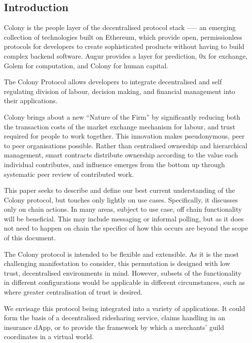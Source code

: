 \subsection*{Introduction}

Colony is the people layer of the decentralised protocol stack --— an emerging collection of technologies built on Ethereum, which provide open, permissionless protocols for developers to create sophisticated products without having to build complex backend software. Augur provides a layer for prediction, 0x for exchange, Golem for computation, and Colony for human capital.

The Colony Protocol allows developers to integrate decentralised and self regulating division of labour, decision making, and financial management into their applications. 

Colony brings about a new ``Nature of the Firm'' \cite{The-Nature-of-the-Firm} by significantly reducing both the transaction costs of the market exchange mechanism for labour, and trust required for people to work together. This innovation makes pseudonymous, peer to peer organisations possible. Rather than centralised ownership and hierarchical management, smart contracts distribute ownership according to the value each individual contributes, and influence emerges from the bottom up through systematic peer review of contributed work. 

This paper seeks to describe and define our best current understanding of the Colony protocol, but touches only lightly on use cases. Specifically, it discusses only on chain actions. In many areas, subject to use case, off chain functionality will be beneficial. This may include messaging or informal polling, but as it does not need to happen on chain the specifics of how this occurs are beyond the scope of this document. 

The Colony protocol is intended to be flexible and extensible. As it is the most challenging manifestation to consider, this permutation is designed with low trust, decentralised environments in mind. However, subsets of the functionality in different configurations would be applicable in different circumstances, such as where greater centralisation of trust is desired.

We envisage this protocol being integrated into a variety of applications. It could form the basis of a decentralised ridesharing service, claims handling in an insurance dApp, or to provide the framework by which a merchants’ guild coordinates in a virtual world.







